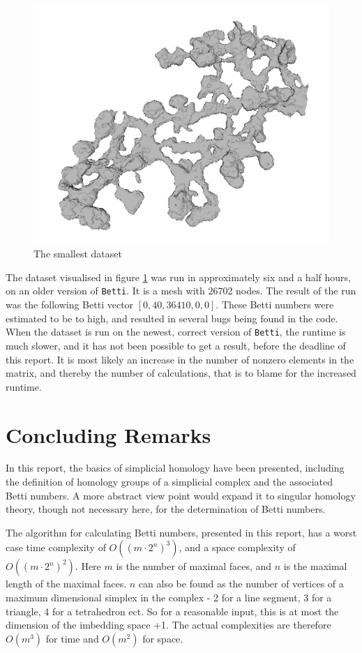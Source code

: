 \documentclass[11pt,a4paper,twoside]{report}
\begin{document}
\begin{figure}[H]
\center
\includegraphics[scale=0.5]{testmesh00.png}
\caption{The smallest dataset}
\label{fig:mesh_}
\end{figure}
The dataset visualised in figure \ref{fig:mesh_} was run in approximately six and a half hours, on an older version of \texttt{Betti}. It is a mesh with 26702 nodes. The result of the run was the following Betti vector $[0,40,36410,0,0]$. These Betti numbers were estimated to be to high, and resulted in several bugs being found in the code. When the dataset is run on the newest, correct version of \texttt{Betti}, the runtime is much slower, and it has not been possible to get a result, before the deadline of this report. It is most likely an increase in the number of nonzero elements in the matrix, and thereby the number of calculations, that is to blame for the increased runtime.

\chapter{Concluding Remarks}
In this report, the basics of simplicial homology have been presented, including the definition of homology groups of a simplicial complex and the associated Betti numbers.
A more abstract view point would expand it to singular homology theory, though not necessary here, for the determination of Betti numbers.

The algorithm for calculating Betti numbers, presented in this report, has a worst case time complexity of $O((m\cdot 2^n)^3)$, and a space complexity of $O((m\cdot 2^n)^2)$. Here $m$ is the number of maximal faces, and $n$ is the maximal length of the maximal faces. $n$ can also be found as the number of vertices of a maximum dimensional simplex in the complex - 2 for a line segment, 3 for a triangle, 4 for a tetrahedron ect. So for a reasonable input, this is at most the dimension of the imbedding space +1. The actual complexities are therefore $O(m^3)$ for time and $O(m^2)$ for space. 
\end{document}

